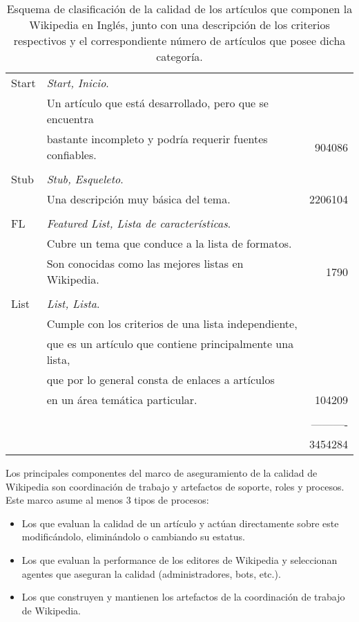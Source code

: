 \begin{table}
\begin{center}
\begin{tabular}{l  l  r}
	Start 			& \emph{Start, Inicio}.  \\
				& Un art\'iculo que est\'a desarrollado, pero que se encuentra \\
				& bastante incompleto y podr\'ia requerir fuentes confiables. & 904086 \\ \\
	Stub 			& \emph{Stub, Esqueleto}.  \\
				& Una descripci\'on muy b\'asica del tema. & 2206104 \\ \\
	FL 			& \emph{Featured List, Lista de caracter\'isticas}.  \\
				& Cubre un tema que conduce a la lista de formatos. \\
				& Son conocidas como las mejores listas en Wikipedia. & 1790 \\ \\					
	List 			& \emph{List, Lista}.  \\
				& Cumple con los criterios de una lista independiente,  \\
				& que es un art\'iculo que contiene principalmente una lista, \\
				& que por lo general consta de enlaces a art\'iculos \\
				& en un \'area tem\'atica particular. & 104209 \\ \\	
				&											& ---------- \\
				&											& 3454284 \\

	\hline
\end{tabular}
\end{center}
\caption{Esquema de clasificaci\'on de la calidad de los art\'iculos que componen la Wikipedia en Ingl\'es, junto con una descripci\'on de los criterios respectivos y el correspondiente n\'umero de art\'iculos que posee dicha categor\'ia.}
\label{table:clas-calid}
\end{table}

Los principales componentes del marco de aseguramiento de la calidad de Wikipedia son coordinaci\'on de trabajo y artefactos de soporte, roles y procesos. Este marco asume al menos 3 tipos de procesos:

\begin{itemize}
\item Los que evaluan la calidad de un art\'iculo y act\'uan directamente sobre este modific\'andolo, elimin\'andolo o cambiando su estatus.
\item Los que evaluan la performance de los editores de Wikipedia y seleccionan agentes que aseguran la calidad (administradores, bots, etc.).
\item Los que construyen y mantienen los artefactos de la coordinaci\'on de trabajo de Wikipedia.
\end{itemize}

